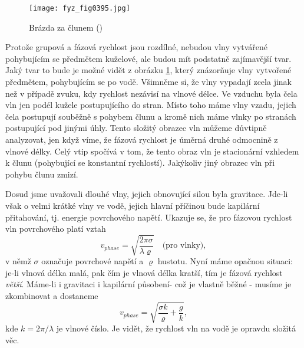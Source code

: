   \begin{figure}[ht!] %
    \centering
    \texttt{[image: fyz\_fig0395.jpg]}
    \caption{Brázda za člunem
             (\cite[s.~696]{Feynman01})}
    \label{fyz:fig0395}
  \end{figure}
  
  Protože grupová a fázová rychlost jsou rozdílné, nebudou vlny vytvářené pohybujícím se předmětem 
  kuželové, ale budou mít podstatně zajímavější tvar. Jaký tvar to bude je možné vidět z obrázku 
  \ref{fyz:fig0395}, který znázorňuje vlny vytvořené předmětem, pohybujícím se po vodě. Všimněme si, 
  že vlny vypadají zcela jinak než v případě zvuku, kdy rychlost nezávisí na vlnové délce. Ve 
  vzduchu byla čela vln jen podél kužele postupujícího do stran. Místo toho máme vlny vzadu, jejich 
  čela postupují souběžně s pohybem člunu a kromě nich máme vlnky po stranách postupující pod 
  jinými úhly. Tento složitý obrazec vln můžeme důvtipně analyzovat, jen když víme, že fázová 
  rychlost je úměrná druhé odmocnině z vlnové délky. Celý vtip spočívá v tom, že tento obraz vln je 
  stacionární vzhledem k člunu (pohybující se konstantní rychlostí). Jakýkoliv jiný obrazec vln při 
  pohybu člunu zmizí.
  
  Dosud jsme uvažovali dlouhé vlny, jejich obnovující silou byla gravitace. Jde-li však o velmi 
  krátké vlny ve vodě, jejich hlavní příčinou bude kapilární přitahování, tj. energie povrchového 
  napětí. Ukazuje se, že pro fázovou rychlost vln povrchového platí vztah
  \begin{equation*}
    v_{phase} = \sqrt{\dfrac{2\pi\sigma}{\lambda\varrho}}\quad\text{(pro vlnky)},
  \end{equation*}
  v němž \(\sigma\) označuje povrchové napětí a \(\varrho\) hustotu. Nyní máme opačnou situaci: 
  je-li vlnová délka malá, pak čím je vlnová délka kratší, tím je fázová rychlost \emph{větší}. 
  Máme-li i gravitaci i kapilární působení- což je vlastně běžné - musíme je zkombinovat a dostaneme
  \begin{equation*}
    v_{phase} = \sqrt{\dfrac{\sigma k}{\varrho} + \dfrac{g}{k}},
  \end{equation*}
  kde \(k = 2\pi/\lambda\) je vlnové číslo. Je vidět, že rychlost vln na vodě je opravdu složitá 
  věc.

